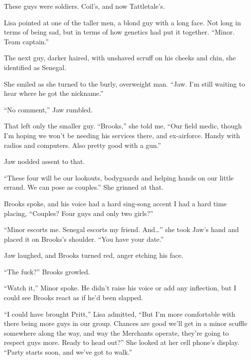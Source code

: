 These guys were soldiers.  Coil's, and now Tattletale's.



Lisa pointed at one of the taller men, a blond guy with a long face.  Not long in terms of being sad, but in terms of how genetics had put it together.  ``Minor.  Team captain.''



The next guy, darker haired, with unshaved scruff on his cheeks and chin, she identified as Senegal.



She smiled as she turned to the burly, overweight man.  ``Jaw.  I'm still waiting to hear where he got the nickname.''



``No comment,'' Jaw rumbled.



That left only the smaller guy.  ``Brooks,'' she told me, ``Our field medic, though I'm hoping we won't be needing his services there, and ex-airforce.  Handy with radios and computers.  Also pretty good with a gun.''



Jaw nodded assent to that.



``These four will be our lookouts, bodyguards and helping hands on our little errand.  We can pose as couples.''  She grinned at that.



Brooks spoke, and his voice had a hard sing-song accent I had a hard time placing, ``Couples?  Four guys and only two girls?''



``Minor escorts me.  Senegal escorts my friend.  And\ldots'' she took Jaw's hand and placed it on Brooks's shoulder.  ``You have your date.''



Jaw laughed, and Brooks turned red, anger etching his face.



``The fuck?'' Brooks growled.



``Watch it,'' Minor spoke.  He didn't raise his voice or add any inflection, but I could see Brooks react as if he'd been slapped.



``I could have brought Pritt,'' Lisa admitted, ``But I'm more comfortable with there being more guys in our group.  Chances are good we'll get in a minor scuffle somewhere along the way, and way the Merchants operate, they're going to respect guys more.  Ready to head out?''  She looked at her cell phone's display.  ``Party starts soon, and we've got to walk.''



